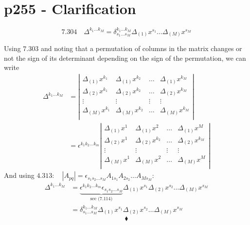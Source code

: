 \section{p255 - Clarification}
\begin{tcolorbox}
$$\mathbf{7.304} \quad \Delta^{k_1\dots k_M}=\delta^{k_1\dots k_M}_{s_1\dots s_M}\Delta_{(1)}x^{s_1} \dots \Delta_{(M)}x^{s_M}$$ 
\end{tcolorbox}
Using $\mathbf{7.303}$ and noting that a permutation of columns in the matrix changes or not  the sign of its determinant depending on the sign of the permutation, we can write 
\begin{align}\Delta^{k_1\dots k_M} &= \left|\begin{matrix}
\Delta_{(1)}x^{k_1}&\Delta_{(1)}x^{k_2} &\dots&\Delta_{(1)}x^{k_M}\\
\Delta_{(2)}x^{k_1}&\Delta_{(2)}x^{k_2} &\dots&\Delta_{(2)}x^{k_M}\\
\vdots&\vdots&\vdots&\vdots\\
\Delta_{(M)}x^{k_1}&\Delta_{(M)}x^{k_2} &\dots&\Delta_{(M)}x^{k_M}\\
\end{matrix}\right|\\
&= \epsilon^{k_1 k_2\dots k_m}\left|\begin{matrix}
\Delta_{(1)}x^{1}&\Delta_{(1)}x^{2} &\dots&\Delta_{(1)}x^{M}\\
\Delta_{(2)}x^{1}&\Delta_{(2)}x^{k_2} &\dots&\Delta_{(2)}x^{k_M}\\
\vdots&\vdots&\vdots&\vdots\\
\Delta_{(M)}x^{1}&\Delta_{(M)}x^{2} &\dots&\Delta_{(M)}x^{M}\\
\end{matrix}\right|
\end{align}
And using $\mathbf{4.313}:\quad \left|A_{pq}\right|= \epsilon_{s_1 s_2 \dots s_M}A_{1 s_1}A_{2 s_2}\dots A_{M s_M}$:
\begin{align}\Delta^{k_1 \dots k_M} &= \underbrace{\epsilon^{k_1 k_2\dots k_m} \epsilon_{s_1 s_2 \dots s_M}}_{\text{see (7.114)}}\Delta_{(1)}x^{s_1}\Delta_{(2)}x^{s_2} \dots \Delta_{(M)}x^{s_M}\\
&= \delta^{k_1\dots k_M}_{s_1\dots s_M}\Delta_{(1)}x^{s_1}\Delta_{(2)}x^{s_2} \dots \Delta_{(M)}x^{s_M}
\end{align}
$$\blacklozenge$$
\newpage

